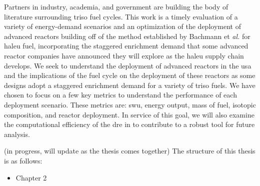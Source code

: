 Partners in industry, academia, and government are building the body of
literature surrounding \gls{triso} fuel cycles. This work is a timely
evaluation of a variety of energy-demand scenarios and an optimization of the
deployment of advanced reactors building off of the method established by
Bachmann et \textit{al.} \cite{bachmann_enrichment_2021} for \gls{haleu} fuel,
incorporating the staggered enrichment demand that some advanced reactor
companies have announced they will explore as the \gls{haleu} supply chain
develops. We seek to understand the deployment of advanced reactors in the
\gls{usa} and the implications of the fuel cycle on the deployment of these
reactors as some designs adopt a staggered enrichment demand for a variety of
\gls{triso} fuels. We have chosen to focus on a few key metrics to understand
the performance of each deployment scenario. These metrics are: \gls{swu},
energy output, mass of fuel, isotopic composition, and reactor deployment. In
service of this goal, we will also examine the computational efficiency of the
\gls{dre} in \cyclus to contribute to a robust tool for future analysis.


\pagebreak

(in progress, will update as the thesis comes together)
The structure of this thesis is as follows:

\begin{itemize}
    \item Chapter 2
\end{itemize}